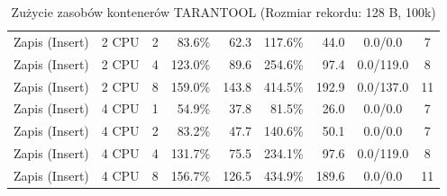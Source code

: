 \begin{table}[ht]
{\begin{tabular}{llcrrrrcc}
Zapis (Insert) & 2 CPU & 2 & 83.6\% & 62.3 & 117.6\% & 44.0 & 0.0/0.0 & 7 \\
Zapis (Insert) & 2 CPU & 4 & 123.0\% & 89.6 & 254.6\% & 97.4 & 0.0/119.0 & 8 \\
Zapis (Insert) & 2 CPU & 8 & 159.0\% & 143.8 & 414.5\% & 192.9 & 0.0/137.0 & 11 \\
Zapis (Insert) & 4 CPU & 1 & 54.9\% & 37.8 & 81.5\% & 26.0 & 0.0/0.0 & 7 \\
Zapis (Insert) & 4 CPU & 2 & 83.2\% & 47.7 & 140.6\% & 50.1 & 0.0/0.0 & 7 \\
Zapis (Insert) & 4 CPU & 4 & 131.7\% & 75.5 & 234.1\% & 97.6 & 0.0/119.0 & 8 \\
Zapis (Insert) & 4 CPU & 8 & 156.7\% & 126.5 & 434.9\% & 189.6 & 0.0/0.0 & 11 \\
\bottomrule
\end{tabular}%
}
\caption{Zużycie zasobów kontenerów TARANTOOL (Rozmiar rekordu: 128 B, 100k)}
\label{tab:resources_tarantool_small_100000}
\end{table}

